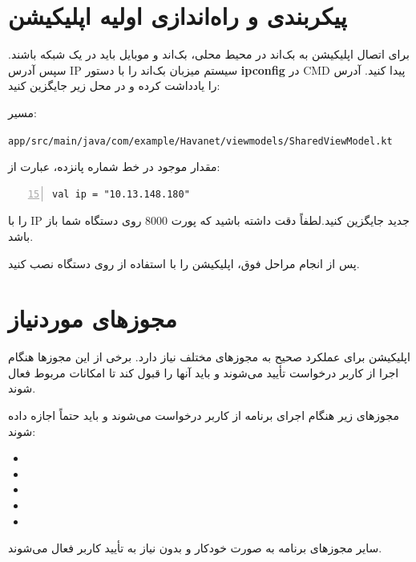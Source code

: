 \documentclass{report}
\begin{document}
\section{پیکربندی و راه‌اندازی اولیه اپلیکیشن}

برای اتصال اپلیکیشن به بک‌اند در محیط محلی، بک‌اند و موبایل باید در یک شبکه باشند. سپس آدرس IP سیستم میزبان بک‌اند را با دستور \textbf{ipconfig} در CMD پیدا کنید. آدرس  را یادداشت کرده و در محل زیر جایگزین کنید:

	مسیر: \\
	\begin{latin}
		\texttt{app/src/main/java/com/example/Havanet/viewmodels/SharedViewModel.kt}\\
	\end{latin}
	مقدار موجود در خط شماره پانزده، عبارت از:
\begin{latin}
\begin{lstlisting}[mathescape=true, numbers=left, firstnumber=15]
val ip = "10.13.148.180"
\end{lstlisting}
\end{latin}
	را با IP جدید جایگزین کنید.لطفاً دقت داشته باشید که پورت 8000 روی دستگاه شما باز باشد.

	

\vspace{0.5cm}

پس از انجام مراحل فوق، اپلیکیشن را با استفاده از  روی دستگاه نصب کنید.

\section{مجوزهای موردنیاز}

اپلیکیشن برای عملکرد صحیح به مجوزهای مختلف نیاز دارد. برخی از این مجوزها هنگام اجرا از کاربر درخواست تأیید می‌شوند و باید آنها را قبول کند تا امکانات مربوط فعال شوند.

مجوزهای زیر هنگام اجرای برنامه از کاربر درخواست می‌شوند و باید حتماً اجازه داده شوند:

\begin{itemize}
	\item {}
	\item {}
	\item {}
	\item {}
	\item {}
\end{itemize}

سایر مجوزهای برنامه به صورت خودکار و بدون نیاز به تأیید کاربر فعال می‌شوند.
\end{document}
